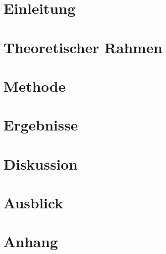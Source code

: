 \documentclass[12pt,oneside, DIV11]{scrbook}
\begin{document}
\mainmatter


\chapter{Einleitung}

\chapter{Theoretischer Rahmen}

\chapter{Methode}

\chapter{Ergebnisse}

\chapter{Diskussion}

\chapter{Ausblick}



\appendix 



\backmatter	

\printbibliography[heading=bibintoc]

\chapter{Anhang}

\end{document}

